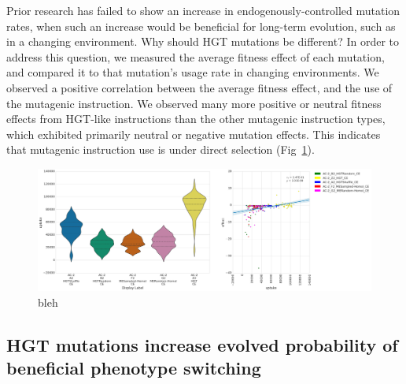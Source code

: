 \documentclass[PhD]{msu-thesis}
\begin{document}
Prior research has failed to show an increase in endogenously-controlled mutation rates, when such an increase would be beneficial for long-term evolution, such as in a changing environment\cite{clune_natural_2008}.
Why should HGT mutations be different? In order to address this question, we measured the average fitness effect of each mutation, and compared it to that mutation's usage rate in changing environments. We observed a positive correlation between the average fitness effect, and the use of the mutagenic instruction. We observed many more positive or neutral fitness effects from HGT-like instructions than the other mutagenic instruction types, which exhibited primarily neutral or negative mutation effects. This indicates that mutagenic instruction use is under direct selection (Fig~\ref{fig:mutagen_use_vs_fitness_effect}).

\begin{figure}[h!]
\begin{center}
\includegraphics[width=0.7\columnwidth]{figures/HGT/mutagen_use_vs_fitness_effect.png}
\caption{bleh
}\label{fig:mutagen_use_vs_fitness_effect}
\end{center}
\end{figure}


\subsection{HGT mutations increase evolved probability of beneficial phenotype switching}
\end{document}
